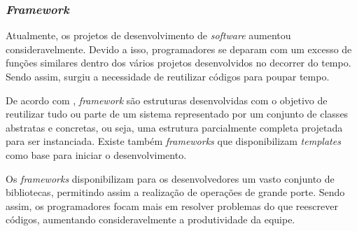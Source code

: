 \subsubsection{\textit{Framework}}

Atualmente, os projetos de desenvolvimento de \textit{software} aumentou consideravelmente. Devido a isso, programadores se deparam com um excesso de funções similares dentro dos vários projetos desenvolvidos no decorrer do tempo. Sendo assim, surgiu a necessidade de reutilizar códigos para poupar tempo. 

De acordo com , \textit{framework} são estruturas desenvolvidas com o objetivo de reutilizar tudo ou parte de um sistema representado por um conjunto de classes abstratas e concretas, ou seja,  uma estrutura parcialmente completa projetada para ser instanciada. Existe também \textit{frameworks}  que disponibilizam \textit{templates} como base para iniciar o desenvolvimento.

Os \textit{frameworks} disponibilizam para os desenvolvedores um vasto conjunto de bibliotecas, permitindo assim a realização de operações de grande porte. Sendo assim, os programadores focam mais em resolver problemas do que reescrever códigos, aumentando consideravelmente a produtividade da equipe. 